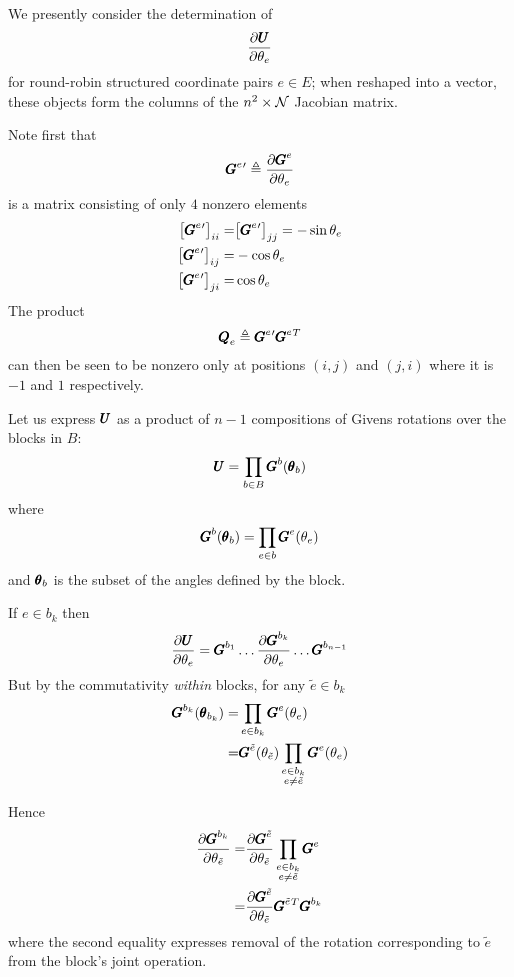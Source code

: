 \documentclass[superscriptaddress,floatfix]{article}
\begin{document}
We presently consider the determination of
\[
\frac{\partial{\pmb{U}}}{\partial\theta_e}
\]
for round-robin structured coordinate pairs $e \in E$; when reshaped
into a vector, these objects form the columns of the $n^2 \times \mathcal{N}$
Jacobian matrix.

Note first that
\[
{\pmb{G}}^e{}' \triangleq \frac{\partial{\pmb{G}}^e}{\partial\theta_e}
\]
is a matrix consisting of only $4$ nonzero elements
\begin{align}
  \big[ {\pmb{G}}^e{}' \big]_{ii} = & \big[ {\pmb{G}}^e{}' \big]_{jj} = -\sin\theta_e \nonumber \\
  \big[ {\pmb{G}}^e{}' \big]_{ij} = & -\cos\theta_e \nonumber \\
  \big[ {\pmb{G}}^e{}' \big]_{ji} = & \cos\theta_e
\end{align}
The product
\begin{align}
  {\pmb{Q}}_e \triangleq {\pmb{G}}^e{}' {\pmb{G}}^e{}^T
  \label{eq:Qdef}
\end{align}
can then be seen to be nonzero only at positions $(i,j)$ and $(j,i)$
where it is $-1$ and $1$ respectively.

Let us express ${\pmb{U}}$ as a product of $n-1$ compositions of Givens
rotations over the blocks in $B$:
\[
{\pmb{U}} = \prod_{b \in B} {\pmb{G}}^b({\pmb{\theta}}_b)
\]
where
\[
{\pmb{G}}^b({\pmb{\theta}}_b) = \prod_{e\in b}{\pmb{G}}^e(\theta_e)
\]
and ${\pmb{\theta}}_b$ is the subset of the angles defined by the block.

If $e \in b_k$ then
\begin{align}
\frac{\partial{\pmb{U}}}{\partial\theta_e} = {\pmb{G}}^{b_1}\ldots
  \frac{\partial {\pmb{G}}^{b_k}}{\partial\theta_e}\ldots {\pmb{G}}^{b_{n-1}}
  \label{eq:UJacBlocks}
\end{align}
But by the commutativity \emph{within} blocks, for any $\tilde{e} \in b_k$
\begin{align}
  {\pmb{G}}^{b_k}({\pmb{\theta}}_{b_k}) = & \prod_{e\in {b_k}}{\pmb{G}}^e(\theta_e) \nonumber \\
  = & {\pmb{G}}^{\tilde{e}}(\theta_{\tilde{e}})\prod_{\substack{e\in b_k\\e\neq \tilde{e}}}{\pmb{G}}^e(\theta_e)
\end{align}

Hence
\begin{align}
  \frac{\partial {\pmb{G}}^{b_k}}{\partial\theta_{\tilde{e}}} = & \frac{\partial{\pmb{G}}^{\tilde{e}}}{\partial\theta_{\tilde{e}}} \prod_{\substack{e\in b_k\\e\neq \tilde{e}}}{\pmb{G}}^e \nonumber \\
                                                         = & \frac{\partial{\pmb{G}}^{\tilde{e}}}{\partial\theta_{\tilde{e}}} {\pmb{G}}^{\tilde{e}}{}^T {\pmb{G}}^{b_k}
\end{align}
where the second equality expresses removal of the rotation
corresponding to $\tilde{e}$ from the block's joint operation.
\end{document}
